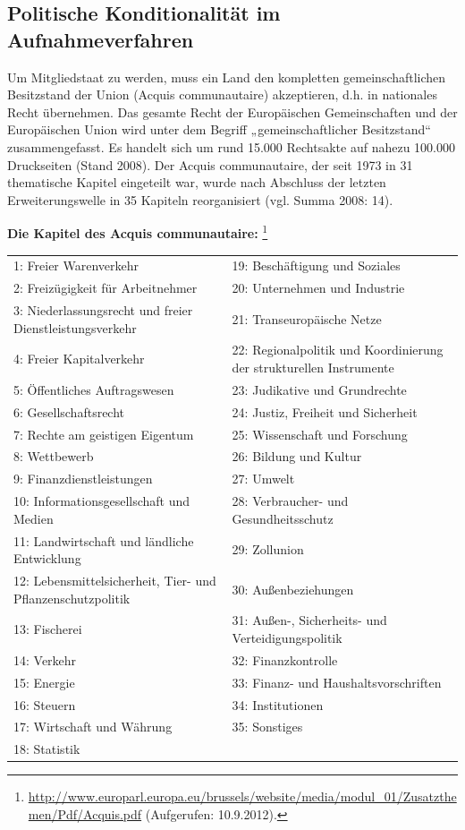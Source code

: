 \subsection{Politische Konditionalität im Aufnahmeverfahren}
Um Mitgliedstaat zu werden, muss ein Land den kompletten gemeinschaftlichen Besitzstand der Union (Acquis communautaire) akzeptieren, d.h. in nationales Recht übernehmen. Das gesamte Recht der Europäischen Gemeinschaften und der Europäischen Union wird unter dem Begriff „gemeinschaftlicher Besitzstand“ zusammengefasst. Es handelt sich um rund 15.000 Rechtsakte auf nahezu 100.000 Druckseiten (Stand 2008). Der Acquis communautaire, der seit 1973 in 31 thematische Kapitel eingeteilt war, wurde nach Abschluss der letzten Erweiterungswelle in 35 Kapiteln reorganisiert (vgl. Summa 2008: 14). \par

{\bf Die Kapitel des Acquis communautaire:} \footnote{\url{http://www.europarl.europa.eu/brussels/website/media/modul_01/Zusatzthemen/Pdf/Acquis.pdf} (Aufgerufen: 10.9.2012).}\\


\begin{tabular}{|p{7cm}|p{7cm}|}\hline

 1: Freier Warenverkehr &19: Beschäftigung und Soziales\\
 2: Freizügigkeit für Arbeitnehmer &20: Unternehmen und Industrie\\
 3: Niederlassungsrecht und freier Dienstleistungsverkehr &21: Transeuropäische Netze\\
 4: Freier Kapitalverkehr &22: Regionalpolitik und Koordinierung der strukturellen Instrumente\\
 5: Öffentliches Auftragswesen &23: Judikative und Grundrechte\\
 6: Gesellschaftsrecht &24: Justiz, Freiheit und Sicherheit\\
 7: Rechte am geistigen Eigentum &25: Wissenschaft und Forschung\\
 8: Wettbewerb &26: Bildung und Kultur\\
 9: Finanzdienstleistungen &27: Umwelt\\
10: Informationsgesellschaft und Medien &28: Verbraucher- und Gesundheitsschutz\\
11: Landwirtschaft und ländliche Entwicklung &29: Zollunion\\
12: Lebensmittelsicherheit, Tier- und Pflanzenschutzpolitik &30: Außenbeziehungen\\
13: Fischerei &31: Außen-, Sicherheits- und Verteidigungspolitik\\
14: Verkehr &32: Finanzkontrolle\\
15: Energie &33: Finanz- und Haushaltsvorschriften\\
16: Steuern &34: Institutionen\\
17: Wirtschaft und Währung &35: Sonstiges \\
18: Statistik&\\\hline
\end{tabular}\par


